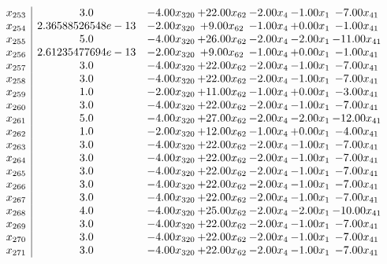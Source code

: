 \documentclass[8pt]{article}
\begin{document}
\[\begin{array}{c| c c@{\hskip 2pt} c@{\hskip 2pt} c@{\hskip 2pt} c@{\hskip 2pt} c@{\hskip 2pt} }
 x_{253}   &  3.0 & -4.00 x_{320} & + 22.00 x_{62} & -2.00 x_{4} & -1.00 x_{1} & -7.00 x_{41}\\
 x_{254}   &  2.36588526548e-13 & -2.00 x_{320} & +  9.00 x_{62} & -1.00 x_{4} & +  0.00 x_{1} & -1.00 x_{41}\\
 x_{255}   &  5.0 & -4.00 x_{320} & + 26.00 x_{62} & -2.00 x_{4} & -2.00 x_{1} & -11.00 x_{41}\\
 x_{256}   &  2.61235477694e-13 & -2.00 x_{320} & +  9.00 x_{62} & -1.00 x_{4} & +  0.00 x_{1} & -1.00 x_{41}\\
 x_{257}   &  3.0 & -4.00 x_{320} & + 22.00 x_{62} & -2.00 x_{4} & -1.00 x_{1} & -7.00 x_{41}\\
 x_{258}   &  3.0 & -4.00 x_{320} & + 22.00 x_{62} & -2.00 x_{4} & -1.00 x_{1} & -7.00 x_{41}\\
 x_{259}   &  1.0 & -2.00 x_{320} & + 11.00 x_{62} & -1.00 x_{4} & +  0.00 x_{1} & -3.00 x_{41}\\
 x_{260}   &  3.0 & -4.00 x_{320} & + 22.00 x_{62} & -2.00 x_{4} & -1.00 x_{1} & -7.00 x_{41}\\
 x_{261}   &  5.0 & -4.00 x_{320} & + 27.00 x_{62} & -2.00 x_{4} & -2.00 x_{1} & -12.00 x_{41}\\
 x_{262}   &  1.0 & -2.00 x_{320} & + 12.00 x_{62} & -1.00 x_{4} & +  0.00 x_{1} & -4.00 x_{41}\\
 x_{263}   &  3.0 & -4.00 x_{320} & + 22.00 x_{62} & -2.00 x_{4} & -1.00 x_{1} & -7.00 x_{41}\\
 x_{264}   &  3.0 & -4.00 x_{320} & + 22.00 x_{62} & -2.00 x_{4} & -1.00 x_{1} & -7.00 x_{41}\\
 x_{265}   &  3.0 & -4.00 x_{320} & + 22.00 x_{62} & -2.00 x_{4} & -1.00 x_{1} & -7.00 x_{41}\\
 x_{266}   &  3.0 & -4.00 x_{320} & + 22.00 x_{62} & -2.00 x_{4} & -1.00 x_{1} & -7.00 x_{41}\\
 x_{267}   &  3.0 & -4.00 x_{320} & + 22.00 x_{62} & -2.00 x_{4} & -1.00 x_{1} & -7.00 x_{41}\\
 x_{268}   &  4.0 & -4.00 x_{320} & + 25.00 x_{62} & -2.00 x_{4} & -2.00 x_{1} & -10.00 x_{41}\\
 x_{269}   &  3.0 & -4.00 x_{320} & + 22.00 x_{62} & -2.00 x_{4} & -1.00 x_{1} & -7.00 x_{41}\\
 x_{270}   &  3.0 & -4.00 x_{320} & + 22.00 x_{62} & -2.00 x_{4} & -1.00 x_{1} & -7.00 x_{41}\\
 x_{271}   &  3.0 & -4.00 x_{320} & + 22.00 x_{62} & -2.00 x_{4} & -1.00 x_{1} & -7.00 x_{41}\\

\end{array}\]
\end{document}
